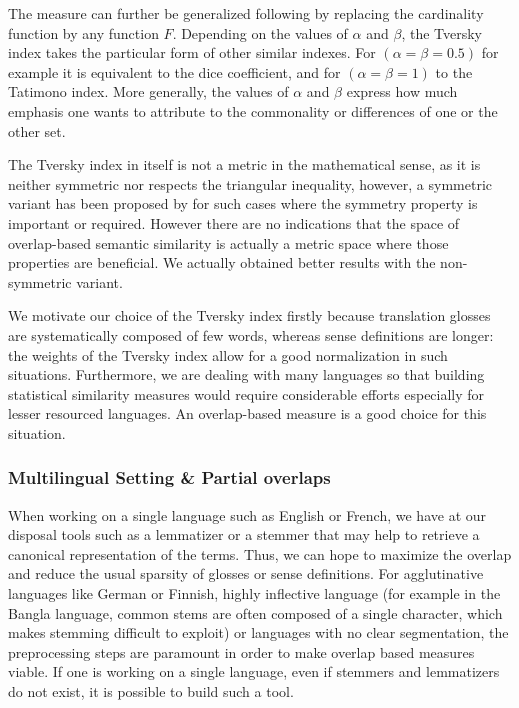 \documentclass[10pt, a4paper]{article}
\begin{document}
The measure can further be generalized following \cite{DBLP:conf/otm/PirroE10} by replacing the cardinality function by any function \(F\). Depending on the values of \(\alpha\) and \(\beta\), the Tversky index takes the particular form of other similar indexes. For \((\alpha=\beta=0.5)\) for example it is equivalent to the dice coefficient, and for  \((\alpha=\beta=1)\) to the Tatimono index. More generally, the values of \(\alpha\) and \(\beta\) express how much emphasis one wants to attribute to the commonality or differences of one or the other set.

 The Tversky index in itself is not a metric in the mathematical sense, as it is neither symmetric nor respects the triangular inequality, however, a symmetric variant has been proposed by \cite{Jimenez2010} for such cases where the symmetry property is important or required. However there are no indications that the space of overlap-based semantic similarity is actually a metric space where those properties are beneficial. We actually obtained better results with the non-symmetric variant.
 
 We motivate our choice of the Tversky index firstly because translation glosses are systematically composed of few words, whereas sense definitions are longer: the weights of the Tversky index allow for a good normalization in such situations. Furthermore, we are dealing with many languages so that building statistical similarity measures would require considerable efforts especially for lesser resourced languages. An overlap-based measure is a good choice for this situation.
% 

\subsubsection{Multilingual Setting \& Partial overlaps}
 When working on a single language such as English or French, we have at our disposal tools such as a lemmatizer or a stemmer that may help to retrieve a canonical representation of the terms. Thus, we can hope to maximize the overlap and reduce the usual sparsity of glosses or sense definitions. For agglutinative languages like German or Finnish, highly inflective language (for example in the Bangla language, common stems are often composed of a single character, which makes stemming difficult to exploit) or languages with no clear segmentation, the preprocessing steps are paramount in order to make overlap based measures viable. If one is working on a single language, even if stemmers and lemmatizers do not exist, it is possible to build such a tool.
\end{document}
